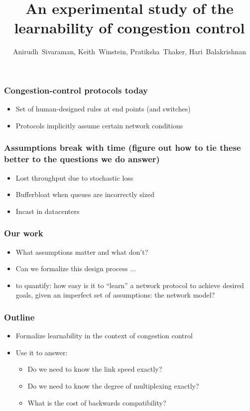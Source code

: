 \documentclass[svgnames]{beamer}
\title{An experimental study of the learnability of congestion control}
\author{Anirudh~Sivaraman, Keith~Winstein, Pratiksha~Thaker, Hari~Balakrishnan}
\institute{MIT CSAIL\vspace{\baselineskip}}
\begin{document}
\begin{frame}

\titlepage

\end{frame}

\begin{Large}
\begin{frame}
\frametitle{Congestion-control protocols today}
\begin{itemize}
\item<2-> Set of human-designed rules at end points (and switches)
\item<3-> Protocols implicitly assume certain network conditions
\end{itemize}
\end{frame}

\begin{frame}
\frametitle{Assumptions break with time (figure out how to tie these better to the questions we do answer)}
\begin{itemize}
\item Lost throughput due to stochastic loss 
\item Bufferbloat when queues are incorrectly sized
\item Incast in datacenters
\end{itemize}
\end{frame}

\begin{frame}
\frametitle{Our work}
\begin{itemize}
\item<1-> What assumptions matter and what don't?
\item<2-> Can we formalize this design process ...
\item<3-> to quantify: how easy is it to “learn” a network protocol to achieve desired goals, given
an imperfect set of assumptions: the network model?
\end{itemize}
\end{frame}

\begin{frame}
\frametitle{Outline}
\begin{itemize}
\item Formalize learnability in the context of congestion control
\item Use it to answer:
\begin{itemize}
\item Do we need to know the link speed exactly?
\item Do we need to know the degree of multiplexing exactly?
\item What is the cost of backwards compatibility?
\end{itemize}
\end{itemize}
\end{frame}


\end{Large}
\end{document}
